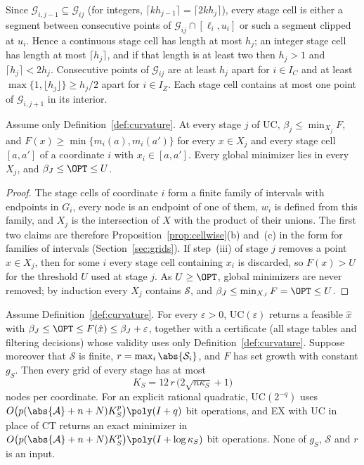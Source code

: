 Since $\mathcal G_{i,j-1}\subseteq\mathcal G_{ij}$ (for integers,
$\lceil kh_{j-1}\rceil=\lceil 2kh_j\rceil$), every stage cell is either a
segment between consecutive points of $\mathcal G_{ij}\cap[\ell_i,u_i]$ or
such a segment clipped at $u_i$. Hence a continuous stage cell has length at
most $h_j$; an integer stage cell has length at most $\lceil h_j\rceil$, and
if that length is at least two then $h_j>1$ and $\lceil h_j\rceil<2h_j$.
Consecutive points of $\mathcal G_{ij}$ are at least $h_j$ apart for
$i\in I_C$ and at least $\max\{1,\lfloor h_j\rfloor\}\ge h_j/2$ apart for
$i\in I_Z$. Each stage cell contains at most one point of
$\mathcal G_{i,j+1}$ in its interior.

\begin{lemma}\label{lem:cells}
Assume only Definition~\ref{def:curvature}. At every stage $j$ of UC,
$\beta_j\le\min_{X_j}F$, and $F(x)\ge\min\{m_i(a),m_i(a')\}$ for every
$x\in X_j$ and every stage cell $[a,a']$ of a coordinate $i$ with
$x_i\in[a,a']$. Every global minimizer lies in every $X_j$, and
$\beta_J\le\OPT\le U$.
\end{lemma}

\begin{proof}
The stage cells of coordinate $i$ form a finite family of intervals with
endpoints in $G_i$, every node is an endpoint of one of them, $w_i$ is
defined from this family, and $X_j$ is the intersection of $X$ with the
product of their unions. The first two claims are therefore
Proposition~\ref{prop:cellwise}(b) and~(c) in the form for families of
intervals (Section~\ref{sec:grids}). If step~(iii) of stage $j$ removes a
point $x\in X_j$, then for some $i$ every stage cell containing $x_i$ is
discarded, so $F(x)>U$ for the threshold $U$ used at stage $j$. As
$U\ge\OPT$, global minimizers are never removed; by induction every $X_j$
contains $\mathcal S$, and $\beta_J\le\min_{X_J}F=\OPT\le U$.
\end{proof}

\begin{theorem}\label{thm:cells}
Assume Definition~\ref{def:curvature}. For every $\varepsilon>0$,
UC$(\varepsilon)$ returns a feasible $\hat x$ with
$\beta_J\le\OPT\le F(\hat x)\le\beta_J+\varepsilon$, together with a
certificate (all stage tables and filtering decisions) whose validity uses
only Definition~\ref{def:curvature}. Suppose moreover that $\mathcal S$ is
finite, $r=\max_i\abs{\mathcal S_i}$, and $F$ has set growth with constant
$g_S$. Then every grid of every stage has at most
\begin{equation}\label{eq:cellcount}
K_S=12\,r\,\bigl(2\sqrt{n\kappa_S}+1\bigr)
\end{equation}
nodes per coordinate. For an explicit rational quadratic, UC$(2^{-q})$ uses
$O\bigl(p(\abs{\mathcal A}+n+N)K_S^p\bigr)\poly(I+q)$ bit operations, and
EX with UC in place of CT returns an exact minimizer in
$O\bigl(p(\abs{\mathcal A}+n+N)K_S^p\bigr)\poly(I+\log\kappa_S)$ bit
operations. None of $g_S$, $\mathcal S$ and $r$ is an input.
\end{theorem}

